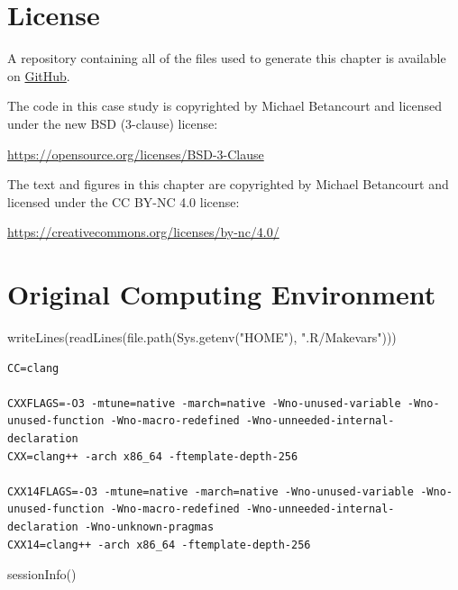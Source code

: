 \documentclass[
  letterpaper,
  DIV=11,
  numbers=noendperiod]{scrartcl}
\newenvironment{Shaded}{\begin{snugshade}}{\end{snugshade}}
\newcommand{\FunctionTok}[1]{\textcolor[rgb]{0.28,0.35,0.67}{#1}}
\newcommand{\NormalTok}[1]{\textcolor[rgb]{0.00,0.23,0.31}{#1}}
\newcommand{\StringTok}[1]{\textcolor[rgb]{0.13,0.47,0.30}{#1}}
\begin{document}
\section*{License}\label{license}

A repository containing all of the files used to generate this chapter
is available on
\href{https://github.com/betanalpha/quarto_modeling_techniques/tree/main/mixture_modeling}{GitHub}.

The code in this case study is copyrighted by Michael Betancourt and
licensed under the new BSD (3-clause) license:

\url{https://opensource.org/licenses/BSD-3-Clause}

The text and figures in this chapter are copyrighted by Michael
Betancourt and licensed under the CC BY-NC 4.0 license:

\url{https://creativecommons.org/licenses/by-nc/4.0/}

\section*{Original Computing
Environment}\label{original-computing-environment}

\begin{Shaded}
\begin{Highlighting}[]
\FunctionTok{writeLines}\NormalTok{(}\FunctionTok{readLines}\NormalTok{(}\FunctionTok{file.path}\NormalTok{(}\FunctionTok{Sys.getenv}\NormalTok{(}\StringTok{"HOME"}\NormalTok{), }\StringTok{".R/Makevars"}\NormalTok{)))}
\end{Highlighting}
\end{Shaded}

\begin{verbatim}
CC=clang

CXXFLAGS=-O3 -mtune=native -march=native -Wno-unused-variable -Wno-unused-function -Wno-macro-redefined -Wno-unneeded-internal-declaration
CXX=clang++ -arch x86_64 -ftemplate-depth-256

CXX14FLAGS=-O3 -mtune=native -march=native -Wno-unused-variable -Wno-unused-function -Wno-macro-redefined -Wno-unneeded-internal-declaration -Wno-unknown-pragmas
CXX14=clang++ -arch x86_64 -ftemplate-depth-256
\end{verbatim}

\begin{Shaded}
\begin{Highlighting}[]
\FunctionTok{sessionInfo}\NormalTok{()}
\end{Highlighting}
\end{Shaded}
\end{document}
